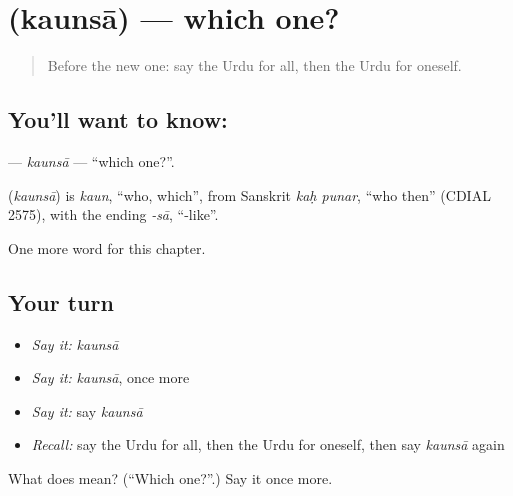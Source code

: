 \section[\texorpdfstring{\ur{کونسا} (kaunsā)}{کونسا (kaunsā)}]{ (kaunsā) — which one?}

\label{lesson:UR-C90-kaunsa}



\begin{quote}
Before the new one: say the Urdu for all, then the Urdu for oneself.
\end{quote}

\subsection*{You'll want to know: }
\textbf{} — \emph{kaunsā} — \textquotedblleft{}which one?\textquotedblright{}.

\begin{cousinweb}
\textbf{} (\emph{kaunsā}) is \emph{kaun}, \textquotedblleft{}who, which\textquotedblright{}, from Sanskrit \emph{kaḥ punar}, \textquotedblleft{}who then\textquotedblright{} (CDIAL 2575), with the ending \emph{-sā}, \textquotedblleft{}-like\textquotedblright{}.
\end{cousinweb}

\begin{grammarlens}[title={What you've built}]
One more word for this chapter.
\end{grammarlens}

\subsection*{Your turn}
\begin{itemize}
\raggedright
  \item \emph{Say it:} \emph{kaunsā}
  \item \emph{Say it:} \emph{kaunsā}, once more
  \item \emph{Say it:} say \emph{kaunsā}
  \item \emph{Recall:} say the Urdu for all, then the Urdu for oneself, then say \emph{kaunsā} again
\end{itemize}

\begin{tcolorbox}[breakable,colback=teal!4,colframe=teal!35!black,title={Before you move on}]
What does  mean? (\textquotedblleft{}Which one?\textquotedblright{}.) Say it once more.
\end{tcolorbox}
